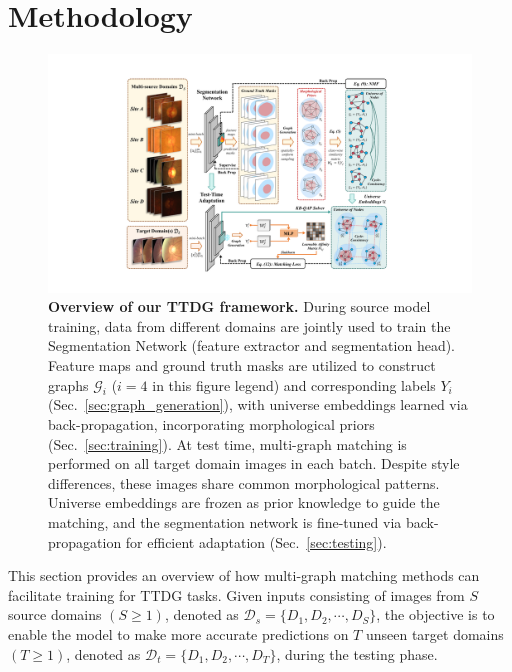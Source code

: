 \section{Methodology}
\begin{figure}[!t]
    \centering
    \includegraphics[width=0.98\linewidth]{Figures/pipeline_final.pdf}
    \caption{\textbf{Overview of our TTDG framework.} During source model training, data from different domains are jointly used to train the Segmentation Network (feature extractor and segmentation head). Feature maps and ground truth masks are utilized to construct graphs $\mathcal{G}_i$ ($i=4$ in this figure legend) and corresponding labels $Y_i$ (Sec.~\ref{sec:graph_generation}), with universe embeddings learned via back-propagation, incorporating morphological priors (Sec.~\ref{sec:training}).
    At test time, multi-graph matching is performed on all target domain images in each batch. Despite style differences, these images share common morphological patterns. Universe embeddings are frozen as prior knowledge to guide the matching, and the segmentation network is fine-tuned via back-propagation for efficient adaptation (Sec.~\ref{sec:testing}).}
     \vspace{-0.5cm}
    \label{fig:pipeline}
\end{figure}
This section provides an overview of how multi-graph matching methods can facilitate training for TTDG tasks. Given inputs consisting of images from $S$ source domains $(S \ge 1)$, denoted as $\mathcal{D}_s = \{ D_1, D_2, \cdots, D_S \}$, the objective is to enable the model to make more accurate predictions on $T$ unseen target domains $ (T\ge 1)$, denoted as $\mathcal{D}_t = \{ D_1, D_2, \cdots, D_T \}$, during the testing phase.

